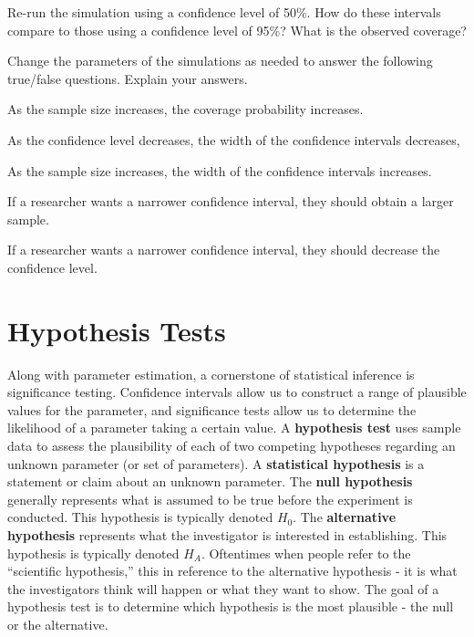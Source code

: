 \documentclass[
]{book}
\theoremstyle{definition}
\theoremstyle{definition}
\theoremstyle{definition}
\theoremstyle{remark}
\begin{document}
Re-run the simulation using a confidence level of 50\%.
How do these intervals compare to those using a confidence level of 95\%? What is the observed coverage?

Change the parameters of the simulations as needed to answer the following true/false questions. Explain your answers.

As the sample size increases, the coverage probability increases.

As the confidence level decreases, the width of the confidence intervals decreases,

As the sample size increases, the width of the confidence intervals increases.

If a researcher wants a narrower confidence interval, they should obtain a larger sample.

If a researcher wants a narrower confidence interval, they should decrease the confidence level.

\hypertarget{ch7_s2}{%
\section{Hypothesis Tests}\label{ch7_s2}}

Along with parameter estimation, a cornerstone of statistical inference is significance testing. Confidence intervals allow us to construct a range of plausible values for the parameter, and significance tests allow us to determine the likelihood of a parameter taking a certain value. A \textbf{hypothesis test} uses sample data to assess the plausibility of each of two competing hypotheses regarding an unknown parameter (or set of parameters). A \textbf{statistical hypothesis} is a statement or claim about an unknown parameter. The \textbf{null hypothesis} generally represents what is assumed to be true before the experiment is conducted. This hypothesis is typically denoted \(H_0\). The \textbf{alternative hypothesis} represents what the investigator is interested in establishing. This hypothesis is typically denoted \(H_A\). Oftentimes when people refer to the ``scientific hypothesis,'' this in reference to the alternative hypothesis - it is what the investigators think will happen or what they want to show. The goal of a hypothesis test is to determine which hypothesis is the most plausible - the null or the alternative.
\end{document}

